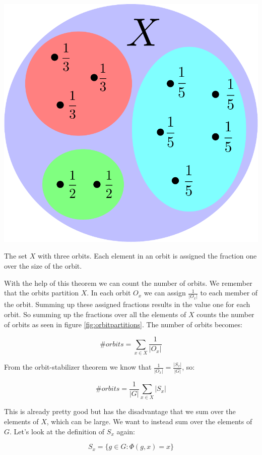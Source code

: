 \begin{marginfigure}[0.5in]
\includegraphics[scale=0.3]{orbitpartitions.pdf}
\caption{The set $X$ with three orbits. Each element in an orbit is assigned the fraction one over the size of the orbit.}
\label{fig:orbitpartitions}
\end{marginfigure}

With the help of this theorem we can count the number of orbits. We remember that the orbits partition $X$. In each orbit $O_x$ we can assign $\frac{1}{|O_x|}$ to each member of the orbit. Summing up these assigned fractions results in the value one for each orbit. So summing up the fractions over all the elements of $X$ counts the number of orbits as seen in figure \ref{fig:orbitpartitions}. The number of orbits becomes:

$$
\#orbits = \sum_{x \in X} \frac{1}{|O_x|}
$$

From the orbit-stabilizer theorem we know that $\frac{1}{|O_x|} = \frac{|S_x|}{|G|}$, so:

$$
\#orbits = \frac{1}{|G|} \sum_{x \in X} |S_x|
$$

This is already pretty good but has the disadvantage that we sum over the elements of $X$, which can be large. We want to instead sum over the elements of $G$. Let's look at the definition of $S_x$ again: 

$$
S_x = \{g \in G: \Phi(g, x) = x\}
$$

